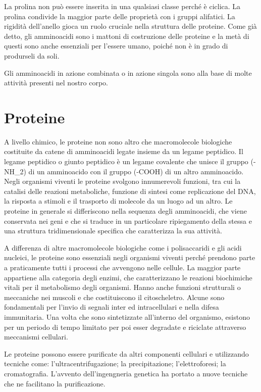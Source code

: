 La prolina non può essere inserita in una qualsiasi classe perché è ciclica. La prolina condivide la maggior parte delle proprietà 
con i gruppi alifatici. La rigidità dell'anello gioca un ruolo cruciale nella struttura delle proteine. Come già detto, 
gli amminoacidi sono i mattoni di costruzione delle proteine e la metà di questi sono anche essenziali per l'essere umano, 
poiché non è in grado di produrseli da soli.  

Gli amminoacidi in azione combinata o in azione singola sono alla base di molte attività presenti nel nostro corpo.


\section{Proteine}\label{sec:cap_sec_subsec}
A livello chimico, le proteine non sono altro che macromolecole biologiche costituite da catene di amminoacidi legate insieme da un legame peptidico. Il legame 
peptidico o giunto peptidico è un legame covalente che unisce il gruppo (-NH\_2) di un amminoacido con il gruppo (-COOH) di un altro amminoacido. Negli organismi 
viventi le proteine svolgono innumerevoli funzioni, tra cui la catalisi delle reazioni metaboliche, funzione di sintesi come replicazione del DNA, la risposta a 
stimoli e il trasporto di molecole da un luogo ad un altro. Le proteine in generale si differiscono nella sequenza degli amminoacidi, che viene conservata nei geni 
e che si traduce in un particolare ripiegamento della stessa e una struttura tridimensionale specifica che caratterizza la sua attività.

A differenza di altre macromolecole biologiche come i polisaccaridi e gli acidi nucleici, le proteine sono essenziali negli organismi viventi perché prendono parte 
a praticamente tutti i processi che avvengono nelle cellule. La maggior parte appartiene alla categoria degli enzimi, che caratterizzano le reazioni biochimiche 
vitali per il metabolismo degli organismi. Hanno anche funzioni strutturali o meccaniche nei muscoli e che costituiscono il citoscheletro. Alcune sono fondamentali 
per l'invio di segnali inter ed intracellulari e nella difesa immunitaria. Una volta che sono sintetizzate all'interno del organismo, esistono per un periodo di 
tempo limitato per poi esser degradate e riciclate attraverso meccanismi cellulari. 

Le proteine possono essere purificate da altri componenti cellulari e utilizzando tecniche come: l'ultracentrifugazione; la precipitazione; l'elettroforesi; 
la cromatografia. L'avvento dell'ingengneria genetica ha portato a nuove tecniche che ne facilitano la purificazione. 

